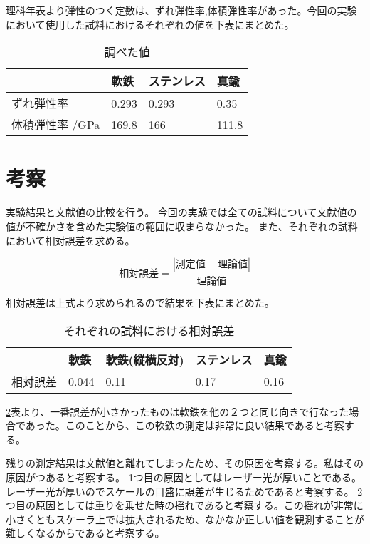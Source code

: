 \documentclass{jsarticle}
\begin{document}
理科年表より弾性のつく定数は、ずれ弾性率,体積弾性率があった。今回の実験において使用した試料におけるそれぞれの値を下表にまとめた。

\begin{table}[H]
    \centering
    \caption{調べた値}
    \label{my-label}
    \begin{tabular}{|l|l|l|l|}
    \hline
          & 軟鉄    & ステンレス & 真鍮    \\ \hline
    ずれ弾性率 & 0.293 & 0.293 & 0.35  \\ \hline
    体積弾性率 /GPa & 169.8 & 166   & 111.8 \\ \hline
    \end{tabular}
    \end{table}

\section{考察}

実験結果と文献値の比較を行う。
今回の実験では全ての試料について文献値の値が不確かさを含めた実験値の範囲に収まらなかった。
また、それぞれの試料において相対誤差を求める。

\begin{equation}
    \label{soutaigosa}
    相対誤差 = \frac{|測定値-理論値|}{理論値}
\end{equation}

相対誤差は上式より求められるので結果を下表にまとめた。

\begin{table}[H]
    \centering
    \caption{それぞれの試料における相対誤差}
    \label{soutaihyou}
    \begin{tabular}{|l|l|l|l|l|}
    \hline
         & 軟鉄           & 軟鉄(縦横反対)           & ステンレス        & 真鍮          \\ \hline
    相対誤差 & 0.044 & 0.11 & 0.17 & 0.16 \\ \hline
    \end{tabular}
    \end{table}

\ref{soutaihyou}表より、一番誤差が小さかったものは軟鉄を他の２つと同じ向きで行なった場合であった。このことから、この軟鉄の測定は非常に良い結果であると考察する。

残りの測定結果は文献値と離れてしまったため、その原因を考察する。私はその原因がつあると考察する。
1つ目の原因としてはレーザー光が厚いことである。レーザー光が厚いのでスケールの目盛に誤差が生じるためであると考察する。
2つ目の原因としては重りを乗せた時の揺れであると考察する。この揺れが非常に小さくともスケーラ上では拡大されるため、なかなか正しい値を観測することが難しくなるからであると考察する。
\end{document}
